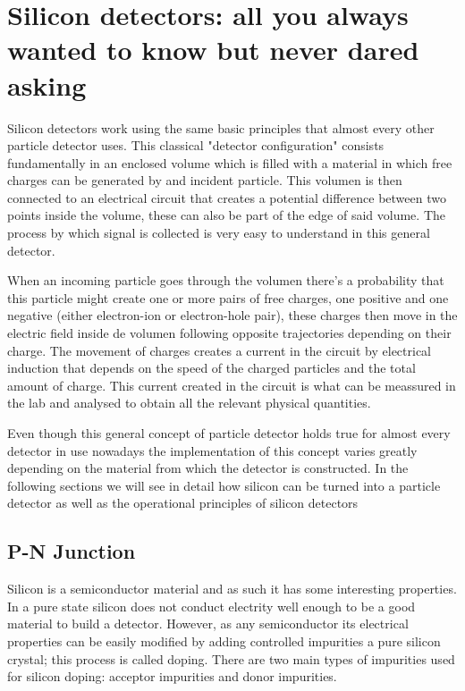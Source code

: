 \chapter{Silicon detectors: all you always wanted to know but never dared asking} %
\label{cha:simulator_development}

Silicon detectors work using the same basic principles that almost every other particle detector uses. This classical "detector configuration" consists fundamentally in an enclosed volume which is filled with a material in which free charges can be generated by and incident particle. This volumen is then connected to an electrical circuit that creates a  potential difference between two points inside the volume, these can also be part of the edge of said volume. The process by which signal is collected is very easy to understand in this general detector.

When an incoming particle goes through the volumen there's a probability that this particle might create one or more pairs of free charges, one positive and one negative (either electron-ion or electron-hole pair), these charges then move in the electric field inside de volumen following opposite trajectories depending on their charge. The movement of charges creates a current in the circuit by electrical induction that depends on the speed of the charged particles and the total amount of charge. This current created in the circuit is what can be meassured in the lab and analysed to obtain all the relevant physical quantities.

Even though this general concept of particle detector holds true for almost every detector in use nowadays the implementation of this concept varies greatly depending on the material from which the detector is constructed. In the following sections we will see in detail how silicon can be turned into a particle detector as well as the operational principles of silicon detectors

\section{P-N Junction}

Silicon is a semiconductor material and as such it has some interesting properties. In a pure state silicon does not conduct electrity well enough to be a good material to build a detector. However, as any semiconductor its electrical properties can be easily modified by adding controlled impurities a pure silicon crystal; this process is called doping. There are two main types of impurities used for silicon doping: acceptor impurities and donor impurities.

